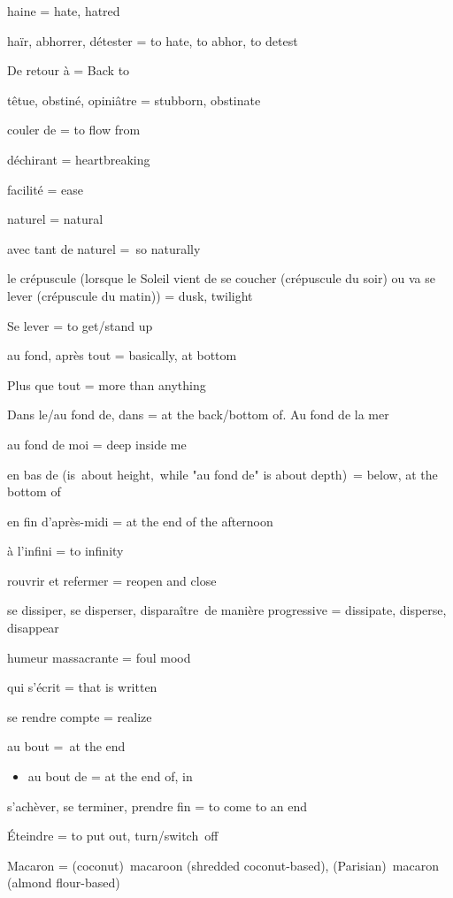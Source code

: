 {haine = hate, hatred}

{haïr, abhorrer, détester = to hate, to abhor, to detest}

{De retour à = Back to}

{têtue, obstiné, opiniâtre = stubborn, obstinate}

{couler de = to flow from}

{déchirant = heartbreaking}

{facilité = ease}

{naturel = natural}

{avec tant de naturel =~}{so naturally}

{le crépuscule (}{lorsque le Soleil vient de se coucher (crépuscule du
soir) ou va se lever (crépuscule du matin)}{) = dusk, twilight}

{Se lever = to get/stand up}

{au fond, après tout = basically, at bottom}

{Plus que tout = more than anything~}

{Dans le/au fond de, dans = at the back/bottom of. Au fond de la mer}

{au fond de moi = deep inside me}

{en bas de (is~about height,~while "au fond de" is about depth)~= below,
at the bottom of}

{en fin d'après-midi = at the end of the afternoon}

{à l'infini = to infinity}

{rouvrir et refermer = reopen and close}

{se dissiper, se disperser, disparaître~}{de manière progressive} {=
dissipate, disperse, disappear}

{humeur massacrante = foul mood}

{qui s'écrit = that is written}

{se rendre compte = realize}

{au bout =~}{at the end}

\begin{itemize}
\item
  {au bout de = at the end of, in}
\end{itemize}

{s'achèver, se terminer, prendre fin = to come to an end}

{Éteindre = to put out, turn/switch~off}

{Macaron = (coconut)~macaroon (shredded coconut-based),
(Parisian)~macaron (almond flour-based)}

